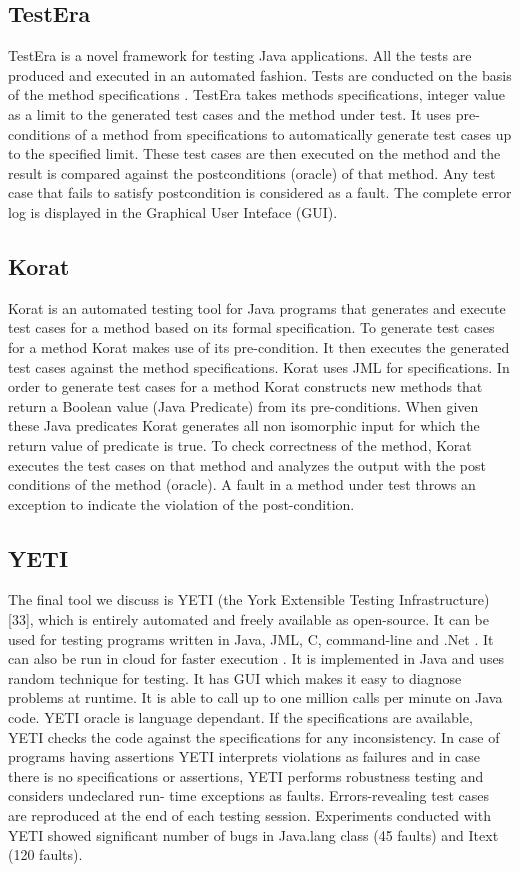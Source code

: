 \subsection{TestEra}
TestEra \cite{Khurshid2004} is a novel framework for testing Java applications. All the tests are produced and executed in an automated fashion. Tests are conducted on the basis of the method specifications \cite{Chang1999}. TestEra takes methods specifications, integer value as a limit to the generated test cases and the method under test. It uses pre-conditions of a method from specifications to automatically generate test cases up to the specified limit. These test cases are then executed on the method and the result is compared against the postconditions (oracle) of that method. Any test case that fails to satisfy postcondition is considered as a fault. The complete error log is displayed in the Graphical User Inteface (GUI).

\subsection{Korat}
Korat \cite{Boyapati2002} is an automated testing tool for Java programs that generates and execute test cases for a method based on its formal specification. To generate test cases for a method Korat makes use of its pre-condition. It then executes the generated test cases against the method specifications. Korat uses JML for specifications. In order to generate test cases for a method Korat constructs new methods that return a Boolean value (Java Predicate) from its pre-conditions. When given these Java predicates Korat generates all non isomorphic input for which the return value of predicate is true. To check correctness of the method, Korat executes the test cases on that method and analyzes the output with the post conditions of the method (oracle). A fault in a method under test throws an exception to indicate the violation of the post-condition.

\subsection{YETI}
The final tool we discuss is YETI (the York Extensible Testing Infrastructure) [33], which is entirely automated and freely available as open-source. It can be used for testing programs written in Java, JML, C, command-line and .Net \cite{Oriol2010c}. It can also be run in cloud for faster execution \cite{Oriol2010}. It is implemented in Java and uses random technique for testing. It has GUI which makes it easy to diagnose problems at runtime. It is able to call up to one million calls per minute on Java code. YETI oracle is language dependant. If the specifications are available, YETI checks the code against the specifications for any inconsistency. In case of programs having assertions YETI interprets violations as failures and in case there is no specifications or assertions, YETI performs robustness testing and considers undeclared run- time exceptions as faults. Errors-revealing test cases are reproduced at the end of each testing session. Experiments conducted with YETI showed significant number of bugs in Java.lang class (45 faults) and Itext (120 faults).

